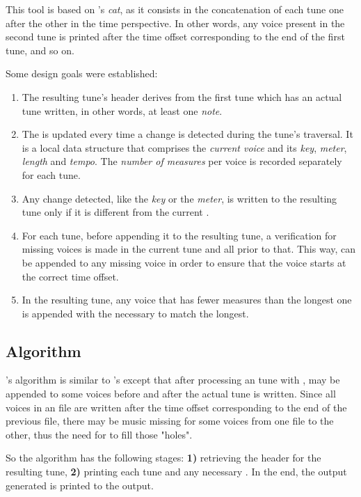 This tool is based on \unix{}'s \emph{cat}, as it consists in the concatenation of each tune one
after the other in the time perspective. In other words, any voice present in the second tune is
printed after the time offset corresponding to the end of the first tune, and so on.

Some design goals were established:

\begin{enumerate}
  \item The resulting tune's header derives from the first tune which has an actual tune written, in
  other words, at least one \emph{note}.
  \item The \context{} is updated every time a change is detected during the tune's traversal. It is
  a local data structure that comprises the \emph{current voice} and its \emph{key}, \emph{meter},
  \emph{length} and \emph{tempo}. The \emph{number of measures} per voice is recorded separately for
  each tune.
  \item Any \context{} change detected, like the \emph{key} or the \emph{meter}, is written to the
  resulting tune only if it is different from the current \context{}.
  \item For each tune, before appending it to the resulting tune, a verification for missing voices
  is made in the current tune and all prior to that. This way, \measurerests{} can be appended to any
  missing voice in order to ensure that the voice starts at the correct time offset.
  \item In the resulting tune, any voice that has fewer measures than the longest one is appended
  with the necessary \measurerests{} to match the longest.
\end{enumerate}

\subsection*{Algorithm}

\catabc{}'s algorithm is similar to \pasteabc{}'s except that after processing an \abc{} tune with
\dt{}, \measurerests{} may be appended to some voices before and after the actual tune is written.
Since all voices in an \abc{} file are written after the time offset corresponding to the end of the
previous \abc{} file, there may be music missing for some voices from one file to the other, thus
the need for \measurerests{} to fill those "holes".

So the algorithm has the following stages: \textbf{1)} retrieving the header for the resulting tune,
\textbf{2)} printing each tune and any necessary \measurerests{}. In the end, the output generated
is printed to the output.

